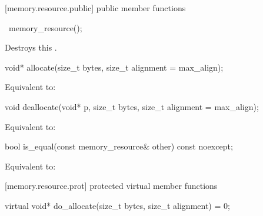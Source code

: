 [memory.resource.public]{ public member functions}

%
\begin{itemdecl}
~memory_resource();
\end{itemdecl}

\begin{itemdescr}
\pnum
\effects
Destroys this .
\end{itemdescr}

%
%
\begin{itemdecl}
void* allocate(size_t bytes, size_t alignment = max_align);
\end{itemdecl}

\begin{itemdescr}
\pnum
\effects
Equivalent to: 
\end{itemdescr}

%
%
\begin{itemdecl}
void deallocate(void* p, size_t bytes, size_t alignment = max_align);
\end{itemdecl}

\begin{itemdescr}
\pnum
\effects
Equivalent to: 
\end{itemdescr}

%
%
\begin{itemdecl}
bool is_equal(const memory_resource& other) const noexcept;
\end{itemdecl}

\begin{itemdescr}
\pnum
\effects
Equivalent to: 
\end{itemdescr}


[memory.resource.prot]{ protected virtual member functions}

%
%
\begin{itemdecl}
virtual void* do_allocate(size_t bytes, size_t alignment) = 0;
\end{itemdecl}

